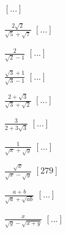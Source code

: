 \begin{esercizio}
\begin{multicols}{4}
\begin{enumeratea}
  \hfill $\left[...\right]$
 \item $\frac{2\sqrt 2}{\sqrt 5+\sqrt 7}$
  \hfill $\left[...\right]$
 \item $\frac 2{\sqrt 2-1}$
  \hfill $\left[...\right]$
 \item $\frac{\sqrt 3+1}{\sqrt 3-1}$
  \hfill $\left[...\right]$
 \item $\frac{2+\sqrt 3}{\sqrt 3+\sqrt 2}$
  \hfill $\left[...\right]$
 \item $\frac 3{2+3\sqrt 3}$
  \hfill $\left[...\right]$
 \item $\frac 1{\sqrt x+\sqrt y}$
  \hfill $\left[...\right]$
 \item $\frac{\sqrt x}{\sqrt x-\sqrt y}$
  \hfill $\left[279\right]$
 \item $\frac{a+b}{\sqrt a+\sqrt{ab}}$
  \hfill $\left[...\right]$
 \item $\frac x{\sqrt y-\sqrt{x+y}}$
  \hfill $\left[...\right]$
 \end{enumeratea}
 \end{multicols}
\end{esercizio}


